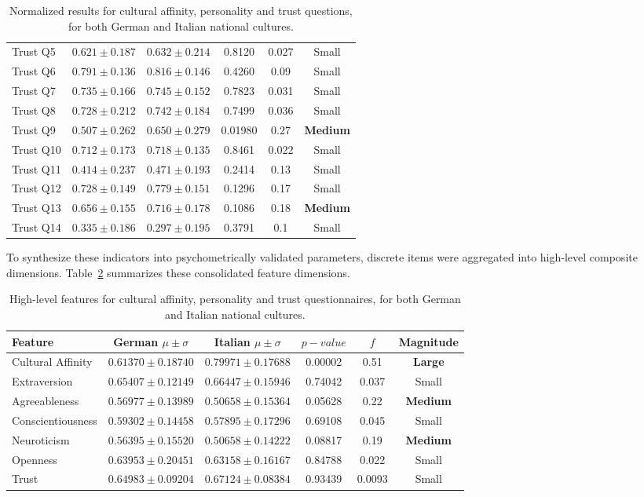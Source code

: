 \begin{table}[ht]
\begin{tabular}{lccccc}
Trust Q5 & $0.621 \pm 0.187$ & $0.632 \pm 0.214$ & 0.8120 & 0.027 & Small \\
Trust Q6 & $0.791 \pm 0.136$ & $0.816 \pm 0.146$ & 0.4260 & 0.09 & Small \\
Trust Q7 & $0.735 \pm 0.166$ & $0.745 \pm 0.152$ & 0.7823 & 0.031 & Small \\
Trust Q8 & $0.728 \pm 0.212$ & $0.742 \pm 0.184$ & 0.7499 & 0.036 & Small \\
Trust Q9 & $0.507 \pm 0.262$ & $0.650 \pm 0.279$ & 0.01980 & 0.27 & \textbf{Medium} \\
Trust Q10 & $0.712 \pm 0.173$ & $0.718 \pm 0.135$ & 0.8461 & 0.022 & Small \\
Trust Q11 & $0.414 \pm 0.237$ & $0.471 \pm 0.193$ & 0.2414 & 0.13 & Small \\
Trust Q12 & $0.728 \pm 0.149$ & $0.779 \pm 0.151$ & 0.1296 & 0.17 & Small \\
Trust Q13 & $0.656 \pm 0.155$ & $0.716 \pm 0.178$ & 0.1086 & 0.18 & \textbf{Medium} \\
Trust Q14 & $0.335 \pm 0.186$ & $0.297 \pm 0.195$ & 0.3791 & 0.1 & Small \\
\bottomrule
\end{tabular}
\caption{Normalized results for cultural affinity, personality and trust questions, for both German and Italian national cultures.}
\label{ch9:tab:intro}
\end{table}
To synthesize these indicators into psychometrically validated parameters, discrete items were aggregated into high-level composite dimensions. 
Table~\ref{ch9:tab:intro_high_level} summarizes these consolidated feature dimensions.
\begin{table}
\centering
\begin{tabular}{lccccc}
\toprule
Feature & German $\mu \pm \sigma$ & Italian $\mu \pm \sigma$  &$p-value$ & $f$ & Magnitude \\
\midrule
Cultural Affinity & $0.61370 \pm 0.18740$ & $0.79971 \pm 0.17688$ & 0.00002 & 0.51 & \textbf{Large} \\
Extraversion & $0.65407 \pm 0.12149$ & $0.66447 \pm 0.15946$ & 0.74042 & 0.037 & Small \\
Agreeableness & $0.56977 \pm 0.13989$ & $0.50658 \pm 0.15364$ & 0.05628 & 0.22 & \textbf{Medium} \\
Conscientiousness & $0.59302 \pm 0.14458$ & $0.57895 \pm 0.17296$ & 0.69108 & 0.045 & Small \\
Neuroticism & $0.56395 \pm 0.15520$ & $0.50658 \pm 0.14222$ & 0.08817 & 0.19 & \textbf{Medium} \\
Openness & $0.63953 \pm 0.20451$ & $0.63158 \pm 0.16167$ & 0.84788 & 0.022 & Small \\
Trust & $0.64983 \pm 0.09204$ & $0.67124 \pm 0.08384$  & 0.93439 & 0.0093 & Small \\
\bottomrule
\end{tabular}
\caption{High-level features for cultural affinity, personality and trust questionnaires, for both German and Italian national cultures.}
\label{ch9:tab:intro_high_level}
\end{table}

